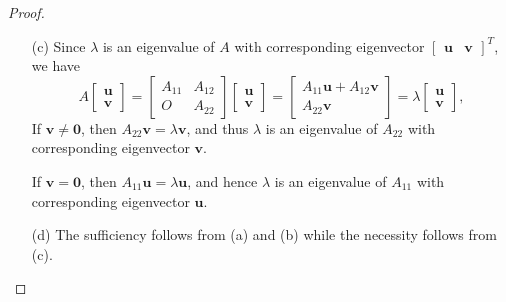 \begin{proof}
\begin{itemize}
  \item[(c)]
    Since $\lambda$ is an eigenvalue of $A$ with corresponding
    eigenvector $
    \begin{bmatrix}
      \mathbf{u} & \mathbf{v}
    \end{bmatrix}^T
    $, we have
        \begin{displaymath}
      A
      \begin{bmatrix}
        \mathbf{u} \\
        \mathbf{v}
      \end{bmatrix}
      =
      \begin{bmatrix}
        A_{11} & A_{12} \\
        O & A_{22}
      \end{bmatrix}
      \begin{bmatrix}
        \mathbf{u}  \\
        \mathbf{v}
      \end{bmatrix}
      =
      \begin{bmatrix}
        A_{11}\mathbf{u} + A_{12}\mathbf{v} \\
        A_{22}\mathbf{v}
      \end{bmatrix}
      =\lambda
      \begin{bmatrix}
        \mathbf{u} \\
        \mathbf{v}
      \end{bmatrix},
    \end{displaymath}
    If $\mathbf{v}\neq \mathbf{0}$,
    then $A_{22}\mathbf{v}=\lambda \mathbf{v}$,
    and thus $\lambda$ is an eigenvalue of $A_{22}$
    with corresponding eigenvector $\mathbf{v}$.

    If $\mathbf{v}=\mathbf{0}$,
    then $A_{11}\mathbf{u}=\lambda\mathbf{u}$,
    and hence $\lambda$ is an eigenvalue of $A_{11}$
    with corresponding eigenvector $\mathbf{u}$.

  \item[(d)]
    The sufficiency follows from (a) and (b)
    while the necessity follows from (c).
  \end{itemize}
\end{proof}
